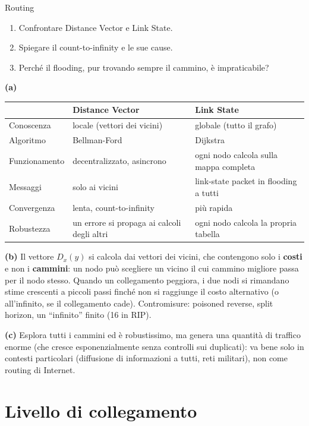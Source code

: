 \begin{esercizio}{Routing}
\begin{enumerate}[label=(\alph*)]
    \item Confrontare Distance Vector e Link State.
    \item Spiegare il count-to-infinity e le sue cause.
    \item Perché il flooding, pur trovando sempre il cammino, è impraticabile?
\end{enumerate}
\end{esercizio}

\svolgimento
\textbf{(a)}
\begin{center}
\small
\begin{tabular}{lll}
\toprule
& \textbf{Distance Vector} & \textbf{Link State} \\
\midrule
Conoscenza & locale (vettori dei vicini) & globale (tutto il grafo) \\
Algoritmo & Bellman-Ford & Dijkstra \\
Funzionamento & decentralizzato, asincrono & ogni nodo calcola sulla mappa completa \\
Messaggi & solo ai vicini & link-state packet in flooding a tutti \\
Convergenza & lenta, count-to-infinity & più rapida \\
Robustezza & un errore si propaga ai calcoli degli altri & ogni nodo calcola la propria tabella \\
\bottomrule
\end{tabular}
\end{center}

\textbf{(b)} Il vettore $D_x(y)$ si calcola dai vettori dei vicini, che contengono solo i \textbf{costi} e non i \textbf{cammini}: un nodo
può scegliere un vicino il cui cammino migliore passa per il nodo stesso. Quando un collegamento peggiora, i due nodi si rimandano stime
crescenti a piccoli passi finché non si raggiunge il costo alternativo (o all'infinito, se il collegamento cade). Contromisure: poisoned
reverse, split horizon, un ``infinito'' finito (16 in RIP).

\textbf{(c)} Esplora tutti i cammini ed è robustissimo, ma genera una quantità di traffico enorme (che cresce esponenzialmente senza
controlli sui duplicati): va bene solo in contesti particolari (diffusione di informazioni a tutti, reti militari), non come routing di Internet.

\section{Livello di collegamento}

